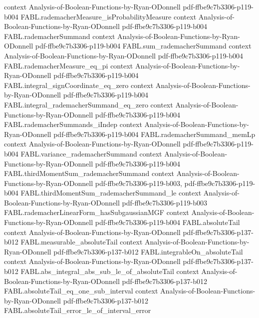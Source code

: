 \begin{theorem}
  {context}
  {Analysis-of-Boolean-Functions-by-Ryan-ODonnell}
  {pdf-ffbe9c7b3306-p119-b004}
\proofstep
  {FABL.rademacherMeasure_isProbabilityMeasure}
  {context}
  {Analysis-of-Boolean-Functions-by-Ryan-ODonnell}
  {pdf-ffbe9c7b3306-p119-b004}
\proofstep
  {FABL.rademacherSummand}
  {context}
  {Analysis-of-Boolean-Functions-by-Ryan-ODonnell}
  {pdf-ffbe9c7b3306-p119-b004}
\proofstep
  {FABL.sum_rademacherSummand}
  {context}
  {Analysis-of-Boolean-Functions-by-Ryan-ODonnell}
  {pdf-ffbe9c7b3306-p119-b004}
\proofstep
  {FABL.rademacherMeasure_eq_pi}
  {context}
  {Analysis-of-Boolean-Functions-by-Ryan-ODonnell}
  {pdf-ffbe9c7b3306-p119-b004}
\proofstep
  {FABL.integral_signCoordinate_eq_zero}
  {context}
  {Analysis-of-Boolean-Functions-by-Ryan-ODonnell}
  {pdf-ffbe9c7b3306-p119-b004}
\proofstep
  {FABL.integral_rademacherSummand_eq_zero}
  {context}
  {Analysis-of-Boolean-Functions-by-Ryan-ODonnell}
  {pdf-ffbe9c7b3306-p119-b004}
\proofstep
  {FABL.rademacherSummands_iIndep}
  {context}
  {Analysis-of-Boolean-Functions-by-Ryan-ODonnell}
  {pdf-ffbe9c7b3306-p119-b004}
\proofstep
  {FABL.rademacherSummand_memLp}
  {context}
  {Analysis-of-Boolean-Functions-by-Ryan-ODonnell}
  {pdf-ffbe9c7b3306-p119-b004}
\proofstep
  {FABL.variance_rademacherSummand}
  {context}
  {Analysis-of-Boolean-Functions-by-Ryan-ODonnell}
  {pdf-ffbe9c7b3306-p119-b004}
\proofstep
  {FABL.thirdMomentSum_rademacherSummand}
  {context}
  {Analysis-of-Boolean-Functions-by-Ryan-ODonnell}
  {pdf-ffbe9c7b3306-p119-b003,
    pdf-ffbe9c7b3306-p119-b004}
\proofstep
  {FABL.thirdMomentSum_rademacherSummand_le}
  {context}
  {Analysis-of-Boolean-Functions-by-Ryan-ODonnell}
  {pdf-ffbe9c7b3306-p119-b003}
\proofstep
  {FABL.rademacherLinearForm_hasSubgaussianMGF}
  {context}
  {Analysis-of-Boolean-Functions-by-Ryan-ODonnell}
  {pdf-ffbe9c7b3306-p119-b004}
\proofstep
  {FABL.absoluteTail}
  {context}
  {Analysis-of-Boolean-Functions-by-Ryan-ODonnell}
  {pdf-ffbe9c7b3306-p137-b012}
\proofstep
  {FABL.measurable_absoluteTail}
  {context}
  {Analysis-of-Boolean-Functions-by-Ryan-ODonnell}
  {pdf-ffbe9c7b3306-p137-b012}
\proofstep
  {FABL.integrableOn_absoluteTail}
  {context}
  {Analysis-of-Boolean-Functions-by-Ryan-ODonnell}
  {pdf-ffbe9c7b3306-p137-b012}
\proofstep
  {FABL.abs_integral_abs_sub_le_of_absoluteTail}
  {context}
  {Analysis-of-Boolean-Functions-by-Ryan-ODonnell}
  {pdf-ffbe9c7b3306-p137-b012}
\proofstep
  {FABL.absoluteTail_eq_one_sub_interval}
  {context}
  {Analysis-of-Boolean-Functions-by-Ryan-ODonnell}
  {pdf-ffbe9c7b3306-p137-b012}
\proofstep
  {FABL.absoluteTail_error_le_of_interval_error}

\end{theorem}
